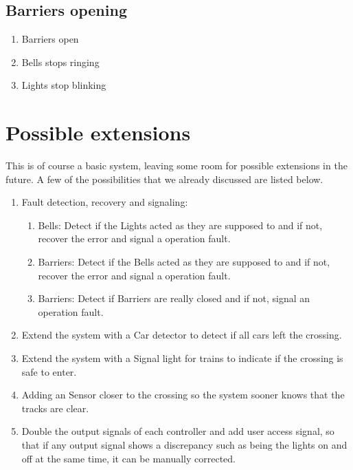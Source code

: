 \documentclass[final]{report}
\begin{document}
\subsection{Barriers opening}
\begin{enumerate}
\item Barriers open
\item Bells stops ringing
\item Lights stop blinking
\end{enumerate}


\section{Possible extensions}
This is of course a basic system, leaving some room for possible extensions in the future.
A few of the possibilities that we already discussed are listed below.

	\begin{enumerate}
	\item Fault detection, recovery and signaling:
		\begin{enumerate}
			\item Bells: Detect if the Lights acted as they are supposed to and if not, recover the error and signal a operation fault.
			\item Barriers: Detect if the Bells acted as they are supposed to and if not, recover the error and signal a operation fault.
			\item Barriers: Detect if Barriers are really closed and if not, signal an operation fault.
		\end{enumerate}

	\item Extend the system with a Car detector to detect if all cars left the crossing.
	\item Extend the system with a Signal light for trains to indicate if the crossing is safe to enter.
	\item Adding an Sensor closer to the crossing so the system sooner knows that the tracks are clear.
	\item Double the output signals of each controller and add user access signal, so that if any output signal shows a discrepancy such as being the lights on and off at the same time, it can be manually corrected.
	\end{enumerate}
\end{document}
